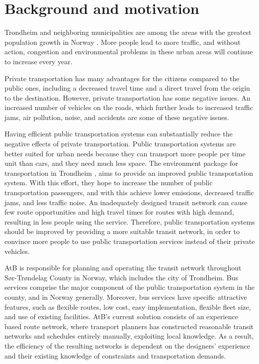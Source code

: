 \section{Background and motivation}
\label{sec:backgroundAndMotivation}

Trondheim and neighboring municipalities are among the areas with the greatest population growth in Norway \citep{website:miljopakken}. More people lead to more traffic, and without action, congestion and environmental problems in these urban areas will continue to increase every year. 

Private transportation has many advantages for the citizens compared to the public ones, including a decreased travel time and a direct travel from the origin to the destination. However, private transportation has some negative issues. An increased number of vehicles on the roads, which further leads to increased traffic jams, air pollution, noise, and accidents are some of these negative issues. 

Having efficient public transportation systems can substantially reduce the negative effects of private transportation. Public transportation systems are better suited for urban needs because they can transport more people per time unit than cars, and they need much less space. The environment package for transportation in Trondheim \citep{website:miljopakken}, aims to provide an improved public transportation system. With this effort, they hope to increase the number of public transportation passengers, and with this achieve lower emissions, decreased traffic jams, and less traffic noise. An inadequately designed transit network can cause few route opportunities and high travel times for routes with high demand, resulting in less people using the service. Therefore, public transportation systems should be improved by providing a more suitable transit network, in order to convince more people to use public transportation services instead of their private vehicles.

AtB \citep{website:atb} is responsible for planning and operating the transit network throughout Sør-Trøndelag County in Norway, which includes the city of Trondheim.  Bus services comprise the major component of the public transportation system in the county, and in Norway generally. Moreover, bus services have specific attractive features, such as flexible routes, low cost, easy implementation, flexible fleet size, and use of existing facilities. AtB's current solution consists of an experience based route network, where transport planners has constructed reasonable transit networks and schedules entirely manually, exploiting local knowledge. As a result, the efficiency of the resulting networks is dependent on the designers' experience and their existing knowledge of constraints and transportation demands.

